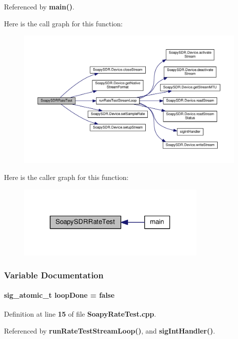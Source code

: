 Referenced by {\bf main()}.



Here is the call graph for this function\+:
\nopagebreak
\begin{figure}[H]
\begin{center}
\leavevmode
\includegraphics[width=350pt]{d8/d20/SoapyRateTest_8cpp_a5116f4b7c259265f891e56760ba4a337_cgraph}
\end{center}
\end{figure}




Here is the caller graph for this function\+:
\nopagebreak
\begin{figure}[H]
\begin{center}
\leavevmode
\includegraphics[width=261pt]{d8/d20/SoapyRateTest_8cpp_a5116f4b7c259265f891e56760ba4a337_icgraph}
\end{center}
\end{figure}




\subsubsection{Variable Documentation}
\paragraph[{loop\+Done}]{\setlength{\rightskip}{0pt plus 5cm}sig\+\_\+atomic\+\_\+t loop\+Done = false\hspace{0.3cm}{\ttfamily [static]}}\label{SoapyRateTest_8cpp_a221efdc4ecd9e4f7bea945ac6b6bf389}


Definition at line {\bf 15} of file {\bf Soapy\+Rate\+Test.\+cpp}.



Referenced by {\bf run\+Rate\+Test\+Stream\+Loop()}, and {\bf sig\+Int\+Handler()}.


